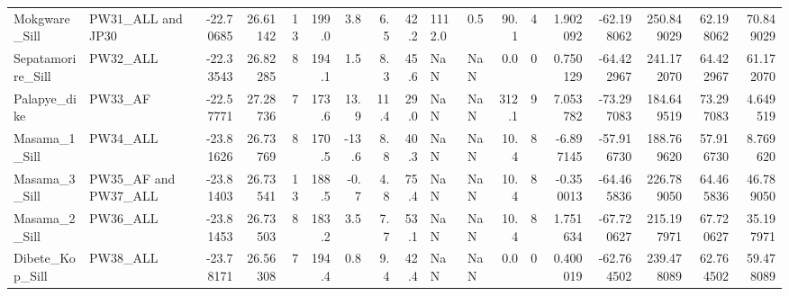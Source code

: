 \documentclass{article}
\begin{document}
{\begin{tabular}{llrrrrrrrllrrrrrrr}
Mokgware\_Sill            &                    PW31\_ALL and JP30 & -22.70685 &   26.61142 &  13 &   199.0 &     3.8 &   6.5 &  42.2 &  1112.0 &        0.5 &           90.1 &    4 &       1.902092 & -62.198062 &  250.849029 &     62.198062 &      70.849029 \\
Sepatamorire\_Sill        &                             PW32\_ALL & -22.33543 &   26.82285 &   8 &   194.1 &     1.5 &   8.3 &  45.6 &     NaN &        NaN &            0.0 &    0 &       0.750129 & -64.422967 &  241.172070 &     64.422967 &      61.172070 \\
Palapye\_dike             &                              PW33\_AF & -22.57771 &   27.28736 &   7 &   173.6 &    13.9 &  11.4 &  29.0 &     NaN &        NaN &          312.1 &    9 &       7.053782 & -73.297083 &  184.649519 &     73.297083 &       4.649519 \\
Masama\_1\_Sill            &                             PW34\_ALL & -23.81626 &   26.73769 &   8 &   170.5 &   -13.6 &   8.8 &  40.3 &     NaN &        NaN &           10.4 &    8 &      -6.897145 & -57.916730 &  188.769620 &     57.916730 &       8.769620 \\
Masama\_3\_Sill            &                 PW35\_AF and PW37\_ALL & -23.81403 &   26.73541 &  13 &   188.5 &    -0.7 &   4.8 &  75.4 &     NaN &        NaN &           10.4 &    8 &      -0.350013 & -64.465836 &  226.789050 &     64.465836 &      46.789050 \\
Masama\_2\_Sill            &                             PW36\_ALL & -23.81453 &   26.73503 &   8 &   183.2 &     3.5 &   7.7 &  53.1 &     NaN &        NaN &           10.4 &    8 &       1.751634 & -67.720627 &  215.197971 &     67.720627 &      35.197971 \\
Dibete\_Kop\_Sill          &                             PW38\_ALL & -23.78171 &   26.56308 &   7 &   194.4 &     0.8 &   9.4 &  42.4 &     NaN &        NaN &            0.0 &    0 &       0.400019 & -62.764502 &  239.478089 &     62.764502 &      59.478089 \\
\bottomrule
\end{tabular}
}

    
\end{document}
